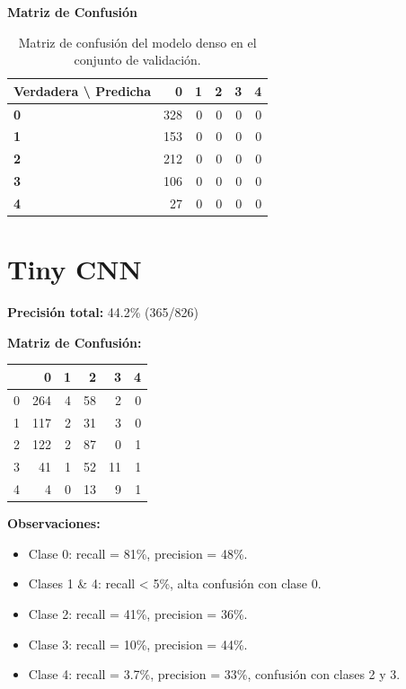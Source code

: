 \documentclass[11pt,spanish,listoffigures,listoftables]{tfgetsinf}
\begin{document}
\noindent\textbf{Matriz de Confusión}
\begin{table}[h]
  \centering
  \begin{tabular}{lrrrrr}
    \toprule
    \textbf{Verdadera \textbackslash{} Predicha} & 0 & 1 & 2 & 3 & 4 \\
    \midrule
    \textbf{0} & 328 & 0 & 0 & 0 & 0 \\
    \textbf{1} & 153 & 0 & 0 & 0 & 0 \\
    \textbf{2} & 212 & 0 & 0 & 0 & 0 \\
    \textbf{3} & 106 & 0 & 0 & 0 & 0 \\
    \textbf{4} & 27  & 0 & 0 & 0 & 0 \\
    \bottomrule
  \end{tabular}
  \caption{Matriz de confusión del modelo denso en el conjunto de validación.}
\end{table}


    
\section{Tiny CNN}

\textbf{Precisión total:} 44.2\% (365/826)

\noindent\textbf{Matriz de Confusión:}
\begin{tabular}{lrrrrr}
    & 0   & 1   & 2   & 3   & 4   \\ \hline
  0 & 264 & 4   & 58  & 2   & 0   \\
  1 & 117 & 2   & 31  & 3   & 0   \\
  2 & 122 & 2   & 87  & 0   & 1   \\
  3 & 41  & 1   & 52  & 11  & 1   \\
  4 & 4   & 0   & 13  & 9   & 1   
\end{tabular}

\bigskip

\noindent\textbf{Observaciones:}
\begin{itemize}
  \item Clase 0: recall = 81\%, precision = 48\%.
  \item Clases 1 \& 4: recall < 5\%, alta confusión con clase 0.
  \item Clase 2: recall = 41\%, precision = 36\%.
  \item Clase 3: recall = 10\%, precision = 44\%.
  \item Clase 4: recall = 3.7\%, precision = 33\%, confusión con clases 2 y 3.
\end{itemize}
\end{document}
